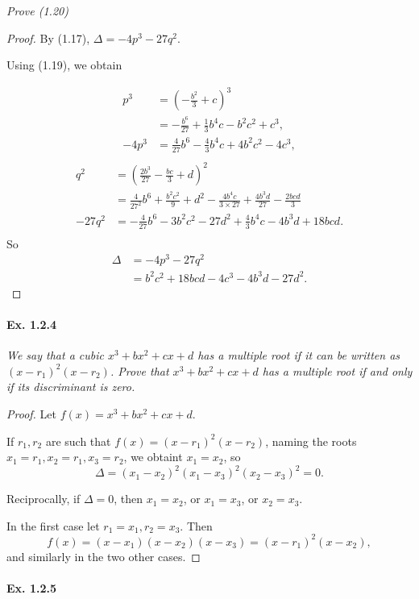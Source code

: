 \documentclass[11pt,a4paper]{article}
\begin{document}
{\it Prove (1.20)
}

\begin{proof}
By (1.17), $\Delta = -4p^3-27q^2$.

Using (1.19), we obtain

\begin{align*}
p^3 &= \left( - \frac{b^2}{3}+c\right)^3\\
&=-\frac{b^6}{27} +  \frac{1}{3} b^4c - b^2c^2 + c^3,\\
-4p^3 &= \frac{4}{27}b^6 - \frac{4}{3} b^4c +4 b^2c^2 -4 c^3,\\
\end{align*}
\begin{align*}
q^2 &= \left(\frac{2b^3}{27} - \frac{bc}{3} + d \right)^2\\
&=\frac{4}{27^2} b^6 +\frac{b^2c^2}{9} + d^2 -\frac{4b^4c}{3\times 27} + \frac{4b^3d}{27} - \frac{2bcd}{3}\\
-27q^2&= -\frac{4}{27} b^6 - 3 b^2c^2 - 27 d^2+ \frac{4}{3} b^4c - 4 b^3d + 18bcd.\\
\end{align*}
So
\begin{align*}
\Delta&= -4p^3-27q^2\\
&= b^2c^2 + 18bcd-4c^3-4b^3d-27d^2.
\end{align*}
\end{proof}

\paragraph{Ex. 1.2.4}

{\it We say that a cubic $x^3+bx^2+cx+d$ has a multiple root if it can be written as $(x-r_1)^2(x-r_2)$. Prove that $x^3+bx^2+cx+d$ has a multiple root if and only if its discriminant is zero.
}

\begin{proof}
Let $f(x) = x^3+bx^2+cx+d$.

If  $r_1,r_2$ are such that $f(x) = (x-r_1)^2(x-r_2)$, naming the roots $x_1=r_1, x_2=r_1,x_3 = r_2$, we obtaint $x_1=x_2$, so
$$\Delta= (x_1-x_2)^2(x_1-x_3)^2(x_2-x_3)^2 = 0.$$

Reciprocally, if $\Delta = 0$, then $x_1=x_2$, or $x_1=x_3$, or $x_2=x_3$.

In the first case let $r_1=x_1, r_2=x_3$. Then
$$f(x) = (x-x_1)(x-x_2)(x-x_3) = (x-r_1)^2(x-x_2),$$
and similarly in the two other cases.
\end{proof}

\paragraph{Ex. 1.2.5}
\end{document}
